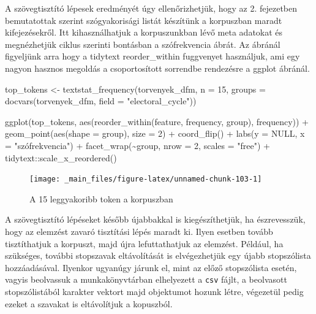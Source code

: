 \documentclass[
]{book}
\newenvironment{Shaded}{\begin{snugshade}}{\end{snugshade}}
\newcommand{\AttributeTok}[1]{\textcolor[rgb]{0.77,0.63,0.00}{#1}}
\newcommand{\ConstantTok}[1]{\textcolor[rgb]{0.00,0.00,0.00}{#1}}
\newcommand{\DecValTok}[1]{\textcolor[rgb]{0.00,0.00,0.81}{#1}}
\newcommand{\FunctionTok}[1]{\textcolor[rgb]{0.00,0.00,0.00}{#1}}
\newcommand{\NormalTok}[1]{#1}
\newcommand{\OtherTok}[1]{\textcolor[rgb]{0.56,0.35,0.01}{#1}}
\newcommand{\SpecialCharTok}[1]{\textcolor[rgb]{0.00,0.00,0.00}{#1}}
\newcommand{\StringTok}[1]{\textcolor[rgb]{0.31,0.60,0.02}{#1}}
\begin{document}
A szövegtisztító lépesek eredményét úgy ellenőrizhetjük, hogy az 2.
fejezetben bemutatottak szerint szógyakorisági listát készítünk a
korpuszban maradt kifejezésekről. Itt kihasználhatjuk a korpuszunkban
lévő meta adatokat és megnézhetjük ciklus szerinti bontásban a
szófrekvencia ábrát. Az ábránál figyeljünk arra hogy a tidytext
reorder\_within fuggvenyet használjuk, ami egy nagyon hasznos megoldás a
csoportosított sorrendbe rendezésre a ggplot ábránál.

\begin{Shaded}
\begin{Highlighting}[]


\NormalTok{top\_tokens }\OtherTok{\textless{}{-}} \FunctionTok{textstat\_frequency}\NormalTok{(torvenyek\_dfm, }\AttributeTok{n =} \DecValTok{15}\NormalTok{, }\AttributeTok{groups =} \FunctionTok{docvars}\NormalTok{(torvenyek\_dfm, }
    \AttributeTok{field =} \StringTok{"electoral\_cycle"}\NormalTok{))}

\FunctionTok{ggplot}\NormalTok{(top\_tokens, }\FunctionTok{aes}\NormalTok{(}\FunctionTok{reorder\_within}\NormalTok{(feature, frequency, group), frequency)) }\SpecialCharTok{+} \FunctionTok{geom\_point}\NormalTok{(}\FunctionTok{aes}\NormalTok{(}\AttributeTok{shape =}\NormalTok{ group), }
    \AttributeTok{size =} \DecValTok{2}\NormalTok{) }\SpecialCharTok{+} \FunctionTok{coord\_flip}\NormalTok{() }\SpecialCharTok{+} \FunctionTok{labs}\NormalTok{(}\AttributeTok{y =} \ConstantTok{NULL}\NormalTok{, }\AttributeTok{x =} \StringTok{"szófrekvencia"}\NormalTok{) }\SpecialCharTok{+} \FunctionTok{facet\_wrap}\NormalTok{(}\SpecialCharTok{\textasciitilde{}}\NormalTok{group, }
    \AttributeTok{nrow =} \DecValTok{2}\NormalTok{, }\AttributeTok{scales =} \StringTok{"free"}\NormalTok{) }\SpecialCharTok{+}\NormalTok{ tidytext}\SpecialCharTok{::}\FunctionTok{scale\_x\_reordered}\NormalTok{()}
\end{Highlighting}
\end{Shaded}

\begin{figure}

{\centering \texttt{[image: \_main\_files/figure-latex/unnamed-chunk-103-1]} 

}

\caption{A 15 leggyakoribb token a korpuszban}\label{fig:unnamed-chunk-103}
\end{figure}

A szövegtisztító lépéseket később újabbakkal is kiegészíthetjük, ha
észrevesszük, hogy az elemzést zavaró tisztítási lépés maradt ki. Ilyen
esetben tovább tisztíthatjuk a korpuszt, majd újra lefuttathatjuk az
elemzést. Például, ha szükséges, további stopszavak eltávolítását is
elvégezhetjük egy újabb stopszólista hozzáadásával. Ilyenkor ugyanúgy
járunk el, mint az előző stopszólista esetén, vagyis beolvassuk a
munkakönyvtárban elhelyezett a \texttt{csv} fájlt, a beolvasott
stopszólistából karakter vektort majd objektumot hozunk létre, végezetül
pedig ezeket a szavakat is eltávolítjuk a kopuszból.
\end{document}
